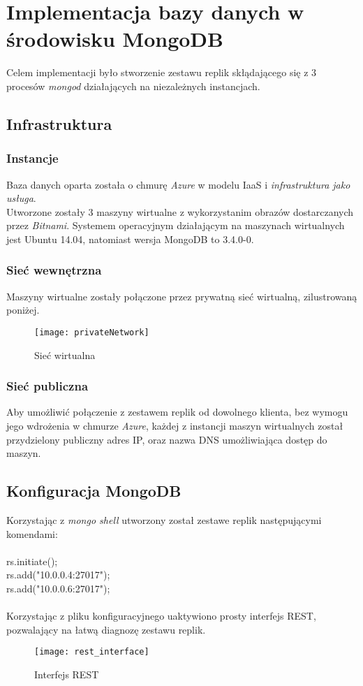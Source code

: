 \section{Implementacja bazy danych w środowisku MongoDB}
Celem implementacji było stworzenie zestawu replik skłądającego się z 3 procesów \textit{mongod} działających na niezależnych instancjach. 

\subsection{Infrastruktura}
\subsubsection{Instancje}
Baza danych oparta została o chmurę \textit{Azure} w modelu IaaS i \textit{infrastruktura jako usługa}.\\
Utworzone zostały 3 maszyny wirtualne z wykorzystanim obrazów dostarczanych przez \textit{Bitnami}. Systemem operacyjnym działającym na maszynach wirtualnych jest Ubuntu 14.04, natomiast wersja MongoDB to 3.4.0-0. \\

\subsubsection{Sieć wewnętrzna}
Maszyny wirtualne zostały połączone przez prywatną sieć wirtualną, zilustrowaną poniżej. 

\begin{figure}[H]
	\centering
	\texttt{[image: privateNetwork]}
	\caption{Sieć wirtualna}
	\label{fig:test}
\end{figure}

\subsubsection{Sieć publiczna}
Aby umożliwić połączenie z zestawem replik od dowolnego klienta, bez wymogu jego wdrożenia w chmurze \textit{Azure}, każdej z instancji maszyn wirtualnych został przydzielony publiczny adres IP, oraz nazwa DNS umożliwiająca dostęp do maszyn.

\subsection{Konfiguracja MongoDB}
Korzystając z \textit{mongo shell} utworzony został zestawe replik następującymi komendami: \\ \\
rs.initiate(); \\
rs.add("10.0.0.4:27017"); \\ 
rs.add("10.0.0.6:27017"); \\ \\

Korzystając z pliku konfiguracyjnego uaktywiono prosty interfejs REST, pozwalający na łatwą diagnozę zestawu replik.

\begin{figure}[H]
	\centering
	\texttt{[image: rest\_interface]}
	\caption{Interfejs REST}
\end{figure}